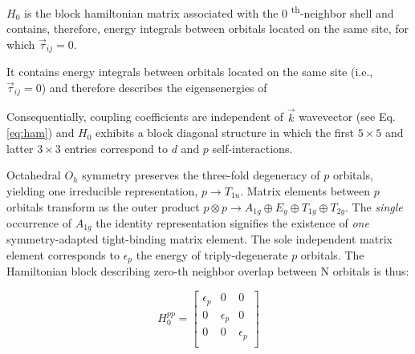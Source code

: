 \documentclass[twocolumn,showpacs,preprintnumbers,superscriptaddress,prb,floatfix,aps,10pt]{revtex4-1}
\newcommand*{\x}{\times}
\begin{document}
$H_0$ is the block hamiltonian matrix associated with the $0$ \textsuperscript{th}-neighbor shell and contains, therefore, energy integrals between orbitals located on the same site, for which $\vec{\tau}_{ij} = 0$.

 It contains energy integrals between orbitals located on the same site (i.e., $\vec{\tau}_{ij} = 0$) and therefore describes the eigensenergies of 

Consequentially, coupling coefficients are independent of $\vec{k}$ wavevector (see Eq. \ref{eq:ham}) and $H_0$ exhibits a block diagonal structure in which the first $5\x5$ and latter $3\x3$ entries correspond to $d$ and $p$ self-interactions.


Octahedral $O_h$ symmetry preserves the three-fold degeneracy of $p$ orbitals, yielding one irreducible representation, $p \rightarrow T_{1u}$. Matrix elements between $p$ orbitals transform as the outer product  $p \otimes p \rightarrow A_{1g} \oplus E_g \oplus T_{1g} \oplus T_{2g}$. The \emph{single} occurrence of $A_{1g}$ the identity representation signifies the existence of \emph{one} symmetry-adapted tight-binding matrix element. The sole independent matrix element corresponds to $\epsilon_p$ the energy of triply-degenerate $p$ orbitals. The Hamiltonian block describing zero-th neighbor overlap between N orbitals is thus:

\begin{equation}
H_0^{pp} =
\begin{bmatrix}
\epsilon_{p} & 0 & 0 \\
0 & \epsilon_{p} & 0 \\
0 & 0 & \epsilon_{p} \\
\end{bmatrix}
\end{equation}
\end{document}
